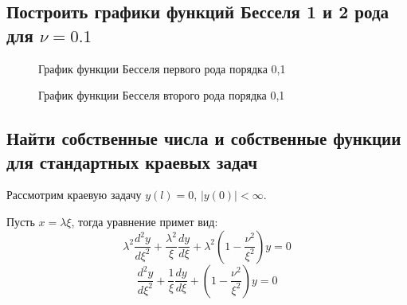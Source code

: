 \documentclass[12pt, a4paper]{report}
\begin{document}
\subsection{Построить графики функций Бесселя 1 и 2 рода для $\nu = 0.1$}
\begin{figure}[H]
	\caption{График функции Бесселя первого рода порядка 0,1}
\end{figure}

\begin{figure}[H]
	\caption{График функции Бесселя второго рода порядка 0,1}
\end{figure}

\subsection{Найти собственные числа и собственные функции для стандартных краевых задач}

Рассмотрим краевую задачу $y(l) = 0$, $|y(0)| < \infty$.

Пусть $x = \lambda \xi$, тогда уравнение примет вид:
\[ \lambda^2 \frac{d^2y}{d\xi^2} + \frac{\lambda^2}{\xi} \frac{dy}{d\xi} + \lambda^2(1 - \frac{\nu^2}{\xi^2})y = 0 \]
\[ \frac{d^2y}{d\xi^2} + \frac{1}{\xi} \frac{dy}{d\xi} + (1 - \frac{\nu^2}{\xi^2})y = 0 \]
\end{document}
